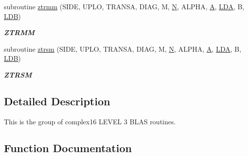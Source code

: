 \begin{DoxyCompactItemize}
subroutine \hyperlink{group__complex16__blas__level3_gafa941b30529f8c06ffb6a1b2e09e0abd}{ztrmm} (S\+I\+D\+E, U\+P\+L\+O, T\+R\+A\+N\+S\+A, D\+I\+A\+G, M, \hyperlink{polmisc_8c_a0240ac851181b84ac374872dc5434ee4}{N}, A\+L\+P\+H\+A, \hyperlink{classA}{A}, \hyperlink{example__user_8c_ae946da542ce0db94dced19b2ecefd1aa}{L\+D\+A}, B, \hyperlink{example__user_8c_a50e90a7104df172b5a89a06c47fcca04}{L\+D\+B})
\begin{DoxyCompactList}\small\item\em {\bfseries Z\+T\+R\+M\+M} \end{DoxyCompactList}\item 
subroutine \hyperlink{group__complex16__blas__level3_gac571a0a6d43e969990456d0676edb786}{ztrsm} (S\+I\+D\+E, U\+P\+L\+O, T\+R\+A\+N\+S\+A, D\+I\+A\+G, M, \hyperlink{polmisc_8c_a0240ac851181b84ac374872dc5434ee4}{N}, A\+L\+P\+H\+A, \hyperlink{classA}{A}, \hyperlink{example__user_8c_ae946da542ce0db94dced19b2ecefd1aa}{L\+D\+A}, B, \hyperlink{example__user_8c_a50e90a7104df172b5a89a06c47fcca04}{L\+D\+B})
\begin{DoxyCompactList}\small\item\em {\bfseries Z\+T\+R\+S\+M} \end{DoxyCompactList}\end{DoxyCompactItemize}


\subsection{Detailed Description}
This is the group of complex16 L\+E\+V\+E\+L 3 B\+L\+A\+S routines. 

\subsection{Function Documentation}
\hypertarget{group__complex16__blas__level3_ga4ef748ade85e685b8b2241a7c56dd21c}{}
